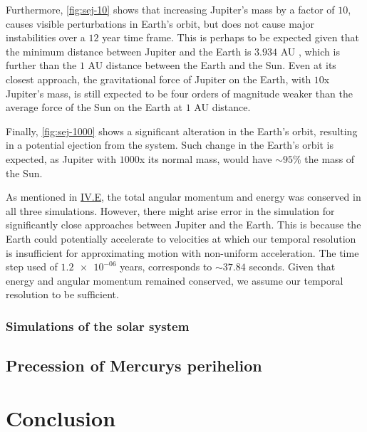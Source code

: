 \documentclass[reprint,english,notitlepage]{revtex4-1}  %
\begin{document}
Furthermore, \ref{fig:sej-10} shows that increasing Jupiter's mass by a factor of \(10\), causes visible perturbations in Earth's orbit, but does not cause major instabilities over a \(12\) year time frame. This is perhaps to be expected given that the minimum distance between Jupiter and the Earth is \(3.934\) AU \citep{NASA2014}, which is further than the \(1\) AU distance between the Earth and the Sun. Even at its closest approach, the gravitational force of Jupiter on the Earth, with \(10\)x Jupiter's mass, is still expected to be four orders of magnitude weaker than the average force of the Sun on the Earth at \(1\) AU distance.

Finally, \ref{fig:sej-1000} shows a significant alteration in the Earth's orbit, resulting in a potential ejection from the system. Such change in the Earth's orbit is expected, as Jupiter with \(1000\)x its normal mass, would have \(\sim 95\%\) the mass of the Sun.

As mentioned in \hyperref[sec:IV:e]{IV.E}, the total angular momentum and energy was conserved in all three simulations. However, there might arise error in the simulation for significantly close approaches between Jupiter and the Earth. This is because the Earth could potentially accelerate to velocities at which our temporal resolution is insufficient for approximating motion with non-uniform acceleration. The time step used of \(\num{1.2e-06}\) years, corresponds to \(\sim 37.84\) seconds. Given that energy and angular momentum remained conserved, we assume our temporal resolution to be sufficient.

\subsubsection{Simulations of the solar system} \label{sec:V:c:ii}

\subsection{Precession of Mercurys perihelion} \label{sec:V:d}






\section{Conclusion} \label{sec:VI}





\onecolumngrid
{}
\newpage
\twocolumngrid
\end{document}
